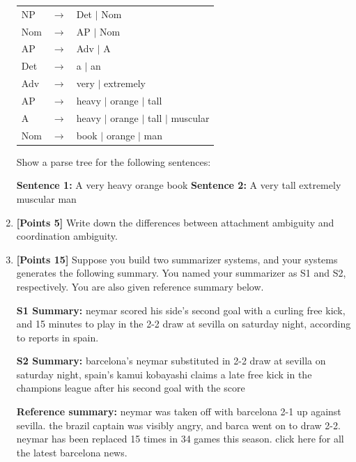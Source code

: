 \documentclass[12pt]{article}
\begin{document}
\begin{enumerate}
            \begin{tabular}{lll}
                  \hline
                  NP  & $\rightarrow$ & Det $|$ Nom                            \\
                  Nom & $\rightarrow$ & AP $|$ Nom                             \\
                  AP  & $\rightarrow$ & Adv $|$ A                              \\
                  \hline
                  Det & $\rightarrow$ & a $|$ an                               \\
                  Adv & $\rightarrow$ & very $|$ extremely                     \\
                  AP  & $\rightarrow$ & heavy $|$ orange $|$ tall              \\
                  A   & $\rightarrow$ & heavy $|$ orange $|$ tall $|$ muscular \\
                  Nom & $\rightarrow$ & book $|$ orange $|$ man                \\
                  \hline
            \end{tabular}

            Show a parse tree for the following sentences:

            \textbf{Sentence 1:} A very heavy orange book
            \textbf{Sentence 2:} A very tall extremely muscular man

      \item \textbf{[Points 5]} Write down the differences between attachment
            ambiguity and coordination ambiguity.

      \item \textbf{[Points 15]} Suppose you build two summarizer systems, and
            your systems generates the following summary. You named your summarizer as
            S1 and S2, respectively. You are also given reference summary below.

            \textbf{S1 Summary:} neymar scored his side's second goal with a
            curling free kick, and 15 minutes to play in the 2-2 draw at sevilla
            on saturday night, according to reports in spain.

            \textbf{S2 Summary:} barcelona's neymar substituted in 2-2 draw at
            sevilla on saturday night, spain's kamui kobayashi claims a late free
            kick in the champions league after his second goal with the score

            \textbf{Reference summary:} neymar was taken off with barcelona 2-1 up against sevilla. the brazil
            captain was visibly angry, and barca went on to draw 2-2. neymar has been replaced 15 times in
            34 games this season. click here for all the latest barcelona news.


\end{enumerate}
\end{document}
